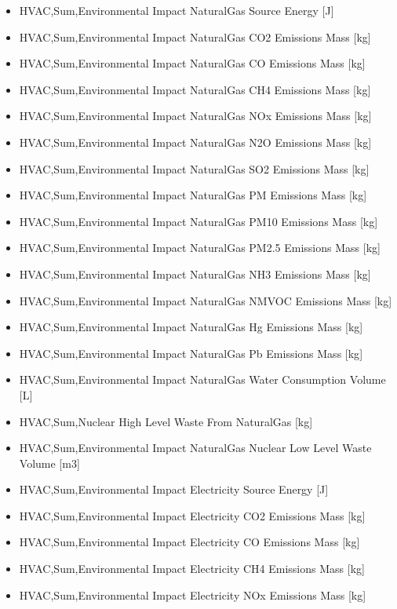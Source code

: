 \begin{itemize}
\item
  HVAC,Sum,Environmental Impact NaturalGas Source Energy {[}J{]}
\item
  HVAC,Sum,Environmental Impact NaturalGas CO2 Emissions Mass {[}kg{]}
\item
  HVAC,Sum,Environmental Impact NaturalGas CO Emissions Mass {[}kg{]}
\item
  HVAC,Sum,Environmental Impact NaturalGas CH4 Emissions Mass {[}kg{]}
\item
  HVAC,Sum,Environmental Impact NaturalGas NOx Emissions Mass {[}kg{]}
\item
  HVAC,Sum,Environmental Impact NaturalGas N2O Emissions Mass {[}kg{]}
\item
  HVAC,Sum,Environmental Impact NaturalGas SO2 Emissions Mass {[}kg{]}
\item
  HVAC,Sum,Environmental Impact NaturalGas PM Emissions Mass {[}kg{]}
\item
  HVAC,Sum,Environmental Impact NaturalGas PM10 Emissions Mass {[}kg{]}
\item
  HVAC,Sum,Environmental Impact NaturalGas PM2.5 Emissions Mass {[}kg{]}
\item
  HVAC,Sum,Environmental Impact NaturalGas NH3 Emissions Mass {[}kg{]}
\item
  HVAC,Sum,Environmental Impact NaturalGas NMVOC Emissions Mass {[}kg{]}
\item
  HVAC,Sum,Environmental Impact NaturalGas Hg Emissions Mass {[}kg{]}
\item
  HVAC,Sum,Environmental Impact NaturalGas Pb Emissions Mass {[}kg{]}
\item
  HVAC,Sum,Environmental Impact NaturalGas Water Consumption Volume {[}L{]}
\item
  HVAC,Sum,Nuclear High Level Waste From NaturalGas {[}kg{]}
\item
  HVAC,Sum,Environmental Impact NaturalGas Nuclear Low Level Waste Volume {[}m3{]}
\item
  HVAC,Sum,Environmental Impact Electricity Source Energy {[}J{]}
\item
  HVAC,Sum,Environmental Impact Electricity CO2 Emissions Mass {[}kg{]}
\item
  HVAC,Sum,Environmental Impact Electricity CO Emissions Mass {[}kg{]}
\item
  HVAC,Sum,Environmental Impact Electricity CH4 Emissions Mass {[}kg{]}
\item
  HVAC,Sum,Environmental Impact Electricity NOx Emissions Mass {[}kg{]}

\end{itemize}

